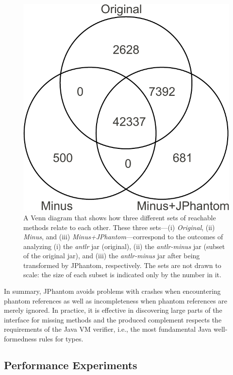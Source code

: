 \begin{figure}[t]
  \centering
  \includegraphics[scale=0.65]{figures/complementation/venn-crop.pdf}
  \caption[Reachable Methods Venn Diagram]{ A Venn diagram that shows
    how three different sets of reachable methods relate to each
    other. These three sets---(i) \emph{Original}, (ii) \emph{Minus},
    and (iii) \emph{Minus+JPhantom}---correspond to the outcomes of
    analyzing (i) the \emph{antlr} jar (original), (ii) the
    \emph{antlr-minus} jar (subset of the original jar), and (iii) the
    \emph{antlr-minus} jar after being transformed by JPhantom,
    respectively. The sets are not drawn to scale: the size of each
    subset is indicated only by the number in it.}
  \label{fig:venn}
\end{figure}

In summary, JPhantom avoids problems with crashes when encountering
phantom references as well as incompleteness when phantom references
are merely ignored. In practice, it is effective in discovering large
parts of the interface for missing methods and the produced complement
respects the requirements of the Java VM verifier, i.e., the most
fundamental Java well-formedness rules for types.


\subsection{Performance Experiments}

